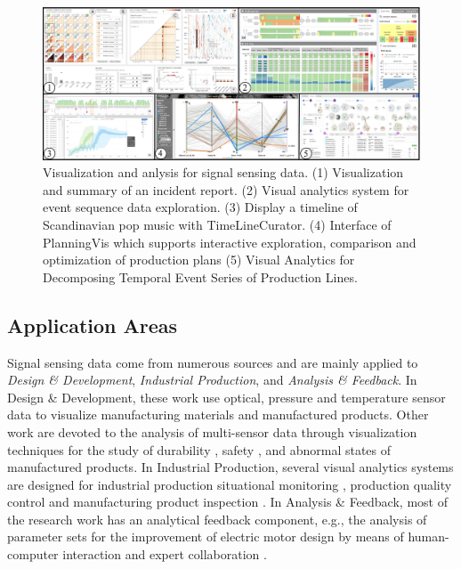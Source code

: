 \documentclass[a4paper,fleqn]{cas-dc}
\begin{document}
\begin{figure}
	\centering
	\includegraphics[width=\textwidth]{Images/signal data.pdf}
	\vspace{-1em}
	\caption{Visualization and anlysis for signal sensing data. (1) Visualization and summary of an incident report. (2) Visual analytics system for event sequence data exploration. (3) Display a timeline of Scandinavian pop music with TimeLineCurator. (4) Interface of PlanningVis which supports interactive exploration, comparison and optimization of production plans (5) Visual Analytics for Decomposing Temporal Event Series of Production Lines.}
	\label{fig:signaldata}
	\vspace{-1.5em}
\end{figure}

\subsection{Application Areas}
Signal sensing data come from numerous sources and are mainly applied to \textit{Design \& Development}, \textit{Industrial Production}, and \textit{Analysis \& Feedback}.
In Design \& Development, these work \cite{Huettenberger2015, Suzuki2020, Zappulla2019} use optical, pressure and temperature sensor data to visualize manufacturing materials and manufactured products. Other work are devoted to the analysis of multi-sensor data through visualization techniques for the study of durability \cite{zhao2019visual}, safety \cite{narechania2020safetylens}, and abnormal states \cite{eirich2021irvine} of manufactured products.
In Industrial Production, several visual analytics systems are designed for industrial production situational monitoring \cite{Zhou2018}, production quality control \cite{Huettenberger2015} and manufacturing product inspection \cite{eirich2021irvine}.
In Analysis \& Feedback, most of the research work has an analytical feedback component, e.g., the analysis of parameter sets for the improvement of electric motor design by means of human-computer interaction and expert collaboration \cite{cibulski2020paved}.
\end{document}
